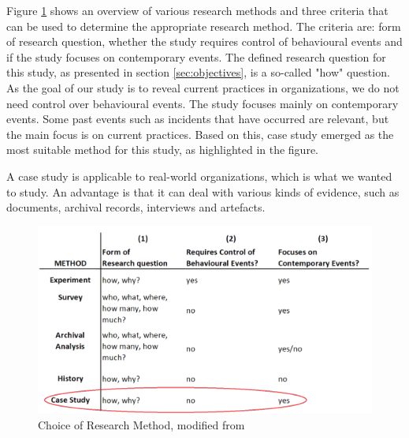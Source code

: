\label{sec:choiceOfMethod}
Figure \ref{fig:methods} shows an overview of various research methods and three criteria that can be used to determine the appropriate research method. The criteria are: form of research question, whether the study requires control of behavioural events and if the study focuses on contemporary events. The defined research question for this study, as presented in section \ref{sec:objectives}, is a so-called "how" question. As the goal of our study is to reveal current practices in organizations, we do not need control over behavioural events. The study focuses mainly on contemporary events. Some past events such as incidents that have occurred are relevant, but the main focus is on current practices. Based on this, case study emerged as the most suitable method for this study, as highlighted in the figure.

A case study is applicable to real-world organizations, which is what we wanted to study. An advantage is that it can deal with various kinds of evidence, such as documents, archival records, interviews and artefacts.

\begin{figure}[h]
\begin{center}
\includegraphics[scale=0.35]{methods.png}
\caption[Choice of Research Method]{Choice of Research Method, modified from \cite{CaseStudyResearch}}
\label{fig:methods}
\end{center}
\end{figure}

